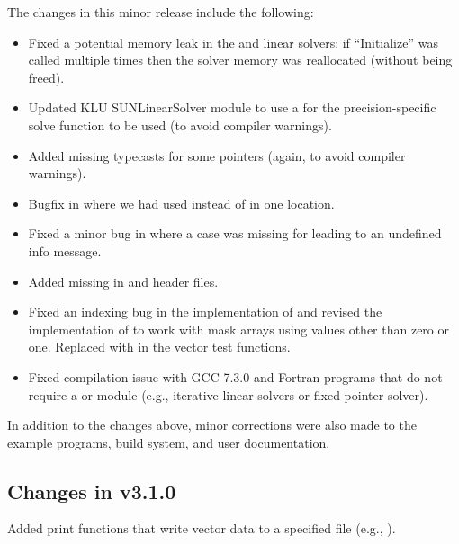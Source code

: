 The changes in this minor release include the following:
\begin{itemize}
\item Fixed a potential memory leak in the {\spgmr} and {\spfgmr} linear
  solvers: if ``Initialize'' was called multiple times then the solver
  memory was reallocated (without being freed).

\item Updated KLU SUNLinearSolver module to use a  for the
  precision-specific solve function to be used (to avoid compiler
  warnings).

\item Added missing typecasts for some  pointers (again, to
  avoid compiler warnings).

\item Bugfix in  where we had used 
  instead of  in one location.

\item Fixed a minor bug in  where a case was missing for
   leading to an undefined info message.

\item Added missing  in {\nvector} and {\sunmatrix}
  header files.

\item Fixed an indexing bug in the {\cuda} {\nvector} implementation of
   and revised the {\raja} {\nvector} implementation of
   to work with mask arrays using values other than zero or
  one. Replaced  with  in the {\raja} vector test functions.

\item Fixed compilation issue with GCC 7.3.0 and Fortran programs that do
  not require a {\sunmatrix} or {\sunlinsol} module (e.g., iterative
  linear solvers or fixed pointer solver).
\end{itemize}
In addition to the changes above, minor corrections were also made to the
example programs, build system, and user documentation.

\subsection*{Changes in v3.1.0}

Added {\nvector} print functions that write vector data to a specified
file (e.g., ).

